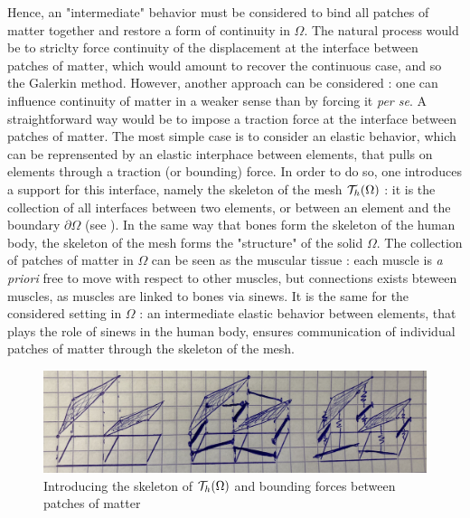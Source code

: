 \documentclass[fleqn]{article}
\begin{document}
            Hence, an "intermediate" behavior must be considered to bind all patches of matter together and restore a form of continuity in $\Omega$. The natural process would be to striclty force continuity of the displacement at the interface between patches of matter, which would amount to recover the continuous case, and so the Galerkin method. However, another approach can be considered : one can influence continuity of matter in a weaker sense than by forcing it \textit{per se}.
            \newline
            A straightforward way would be to impose a traction force at the interface between patches of matter. The most simple case is to consider an elastic behavior, which can be reprensented by an elastic interphace between elements, that pulls on elements through a traction (or bounding) force. In order to do so, one introduces a support for this interface, namely the skeleton of the mesh $\mathcal{T}_h(\Omega)$ : it is the collection of all interfaces between two elements, or between an element and the boundary $\partial \Omega$ (see ).
            \newline
            In the same way that bones form the skeleton of the human body, the skeleton of the mesh forms the "structure" of the solid $\Omega$. The collection of patches of matter in $\Omega$ can be seen as the muscular tissue : each muscle is \textit{a priori} free to move with respect to other muscles, but connections exists bteween muscles,
            as muscles are linked to bones via sinews. It is the same for the considered setting in $\Omega$ : an intermediate elastic behavior between elements, that plays the role of sinews in the human body, ensures communication of individual patches of matter through the skeleton of the mesh.

            \begin{figure}[h]
                \centering
                \includegraphics[width=10.cm]{img/bones.png}
                \caption{Introducing the skeleton of $\mathcal{T}_h(\Omega)$ and bounding forces between patches of matter}
                \label{bones}
            \end{figure}
\end{document}
